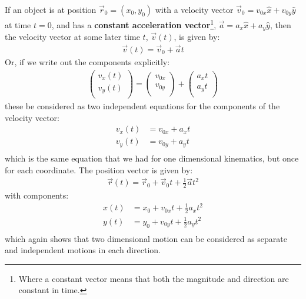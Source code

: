 If an object is at position $\vec r_0=(x_0,y_0)$ with a velocity vector $\vec v_0=v_{0x}\hat x + v_{0y}\hat y$ at time $t=0$, and has a \textbf{constant acceleration vector}\footnote{Where a constant vector means that both the magnitude and direction are constant in time.}, $\vec a = a_x\hat x+a_y\hat y$, then the velocity vector at some later time $t$, $\vec v(t)$, is given by:
\begin{align*}
\vec v(t) = \vec v_0 + \vec a t
\end{align*}
Or, if we write out the components explicitly:
\begin{align*}
\begin{pmatrix}
           v_x(t) \\
           v_y(t) \\
         \end{pmatrix} = \begin{pmatrix}
           v_{0x} \\
           v_{0y} \\
         \end{pmatrix} + \begin{pmatrix}
           a_xt \\
           a_yt \\
         \end{pmatrix}
\end{align*}
these be considered as two independent equations for the components of the velocity vector:
\begin{align*}
v_x(t)&=v_{0x}+a_xt \\
v_y(t)&=v_{0y}+a_yt \\
\end{align*}
which is the same equation that we had for one dimensional kinematics, but once for each coordinate. The position vector is given by:
\begin{align*}
\vec r(t) = \vec r_0 + \vec v_0 t + \frac{1}{2} \vec at^2
\end{align*}
with components:
\begin{align*}
x(t) &= x_0+v_{0x}t+\frac{1}{2}a_xt^2\\
y(t) &= y_0+v_{0y}t+\frac{1}{2}a_yt^2\\
\end{align*}
which again shows that two dimensional motion can be considered as separate and independent motions in each direction.

